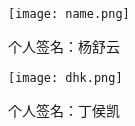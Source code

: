 \begin{figure}[htbp]
    \centering
    \begin{minipage}{0.7\textwidth} %
        \centering
        \texttt{[image: name.png]}
        \caption{个人签名：杨舒云}
        \label{fig:name}
    \end{minipage}
\end{figure}

\begin{figure}[H]
    \centering
    \begin{minipage}{0.45\textwidth} %
        \centering
        \texttt{[image: dhk.png]}
        \caption{个人签名：丁侯凯}
        \label{}
    \end{minipage}
\end{figure}


